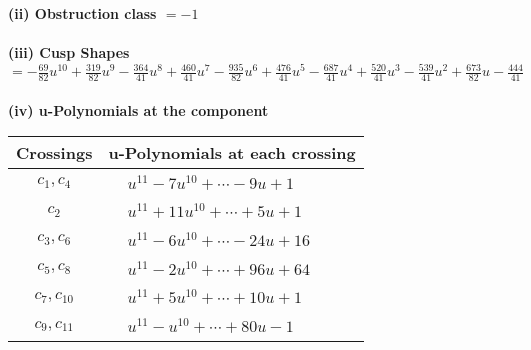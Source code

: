 \documentclass[1p]{elsarticle_modified}
\theoremstyle{definition}
\begin{document}
\flushleft \textbf{(ii) Obstruction class $= -1$}\\~\\
\flushleft \textbf{(iii) Cusp Shapes $= -\frac{69}{82} u^{10}+\frac{319}{82} u^9-\frac{364}{41} u^8+\frac{460}{41} u^7-\frac{935}{82} u^6+\frac{476}{41} u^5-\frac{687}{41} u^4+\frac{520}{41} u^3-\frac{539}{41} u^2+\frac{673}{82} u-\frac{444}{41}$}\\~\\
\newpage\renewcommand{\arraystretch}{1}
\flushleft \textbf{(iv) u-Polynomials at the component}\newline \\
\begin{tabular}{m{50pt}|m{274pt}}
Crossings & \hspace{64pt}u-Polynomials at each crossing \\
\hline $$\begin{aligned}c_{1},c_{4}\end{aligned}$$&$\begin{aligned}
&u^{11}-7 u^{10}+\cdots-9 u+1
\end{aligned}$\\
\hline $$\begin{aligned}c_{2}\end{aligned}$$&$\begin{aligned}
&u^{11}+11 u^{10}+\cdots+5 u+1
\end{aligned}$\\
\hline $$\begin{aligned}c_{3},c_{6}\end{aligned}$$&$\begin{aligned}
&u^{11}-6 u^{10}+\cdots-24 u+16
\end{aligned}$\\
\hline $$\begin{aligned}c_{5},c_{8}\end{aligned}$$&$\begin{aligned}
&u^{11}-2 u^{10}+\cdots+96 u+64
\end{aligned}$\\
\hline $$\begin{aligned}c_{7},c_{10}\end{aligned}$$&$\begin{aligned}
&u^{11}+5 u^{10}+\cdots+10 u+1
\end{aligned}$\\
\hline $$\begin{aligned}c_{9},c_{11}\end{aligned}$$&$\begin{aligned}
&u^{11}- u^{10}+\cdots+80 u-1
\end{aligned}$\\
\hline
\end{tabular}\\~\\
\end{document}
